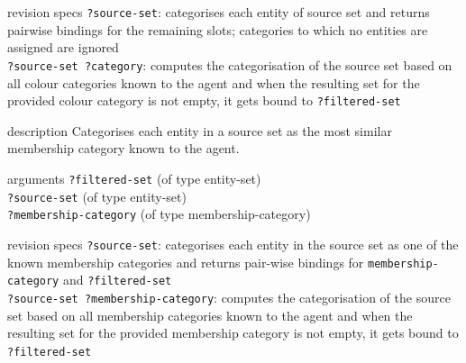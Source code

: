 \begin{explanation}{revision specs}
  \verb+?source-set+: categorises each entity of source set and
  returns pairwise bindings for the remaining slots; categories
  to which no entities are assigned are ignored \\
  \verb+?source-set ?category+: computes the categorisation of the
  source set based on all colour categories known to the agent and
  when the resulting set for the provided colour category is not
  empty, it gets bound to \verb+?filtered-set+
\end{explanation}


\begin{explanation}{description}
  Categorises each entity in a source set as the most similar
  membership category known to the agent.
\end{explanation}

\begin{explanation}{arguments}
  \verb+?filtered-set+ (of type entity-set) \\
  \verb+?source-set+ (of type entity-set) \\
  \verb+?membership-category+ (of type membership-category)
\end{explanation}

\begin{explanation}{revision specs}
  \verb+?source-set+: categorises each entity in the source set as one
  of the known membership categories and returns pair-wise bindings
  for \verb+membership-category+ and \verb+?filtered-set+ \\
  \verb+?source-set ?membership-category+: computes the categorisation
  of the source set based on all membership categories known to the
  agent and when the resulting set for the provided membership category
  is not empty, it gets bound to \verb+?filtered-set+
\end{explanation}




